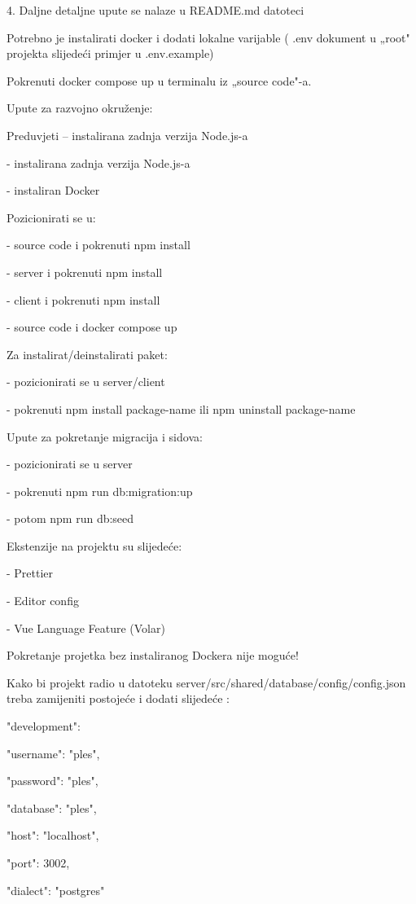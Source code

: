 4.	Daljne detaljne upute se nalaze u README.md datoteci 


Potrebno je instalirati docker i dodati lokalne varijable ( .env dokument u „root" projekta slijedeći primjer u .env.example)

Pokrenuti docker compose up u terminalu iz „source code"-a.

Upute za razvojno okruženje:

Preduvjeti – instalirana zadnja verzija Node.js-a


-	instalirana zadnja verzija Node.js-a

-	instaliran Docker

Pozicionirati se u:

-	source code i pokrenuti npm install

-	server i pokrenuti npm install

-	client i pokrenuti npm install

-	source code i docker compose up

Za instalirat/deinstalirati paket:

-	pozicionirati se u server/client

-	pokrenuti npm install package-name ili npm uninstall package-name

Upute za pokretanje migracija i sidova:

-	pozicionirati se u server

-	pokrenuti npm run db:migration:up 

-	potom npm run db:seed

Ekstenzije na projektu su slijedeće:

-	Prettier

-	Editor config

-	Vue Language Feature (Volar)

Pokretanje projetka bez instaliranog Dockera nije moguće!

Kako bi projekt radio u datoteku server/src/shared/database/config/config.json treba zamijeniti postojeće i dodati slijedeće :



  "development": 

    "username": "ples",

    "password": "ples",

    "database": "ples",

    "host": "localhost",

    "port": 3002,

    "dialect": "postgres"

